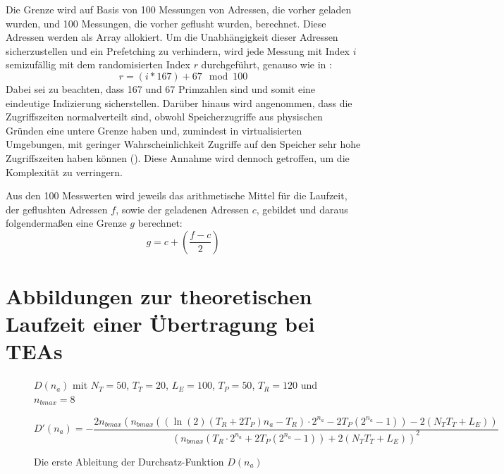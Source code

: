 Die Grenze wird auf Basis von 100 Messungen von Adressen,
die vorher geladen wurden, und 100 Messungen, die vorher
geflusht wurden, berechnet. Diese Adressen werden als Array
allokiert. Um die Unabhängigkeit dieser Adressen sicherzustellen
und ein Prefetching zu verhindern, wird jede Messung mit Index $i$
semizufällig mit dem randomisierten Index $r$ durchgeführt, genauso
wie in \cite[19]{kocher_spectre_2019}:
\[r=(i*167)+67\mod 100\]
Dabei sei zu beachten, dass 167 und 67 Primzahlen sind und somit
eine eindeutige Indizierung sicherstellen.
Darüber hinaus wird angenommen, dass die Zugriffszeiten
normalverteilt sind, obwohl Speicherzugriffe aus physischen
Gründen eine untere Grenze haben und, zumindest in virtualisierten
Umgebungen, mit geringer Wahrscheinlichkeit Zugriffe auf den
Speicher sehr hohe Zugriffszeiten haben können
(\cite[7]{yarom_flushreload_2014}). Diese Annahme wird
dennoch getroffen, um die Komplexität zu verringern.

Aus den 100 Messwerten wird jeweils das arithmetische
Mittel für die Laufzeit, der geflushten Adressen $f$,
sowie der geladenen Adressen $c$, gebildet und daraus
folgendermaßen eine Grenze $g$ berechnet:
\[g=c+\left(\frac{f-c}{2}\right)\]

\clearpage
\section{Abbildungen zur theoretischen Laufzeit einer Übertragung bei \acp{TEA}}
\begin{figure}[H]
    \centering
    \caption{$D(n_a)$ mit $N_T=50$, $T_T=20$, $L_E=100$,
    $T_P=50$, $T_R=120$ und $n_{bmax}=8$\label{figure:theoretical-runtime}}
\end{figure}

\begin{figure}[H]
    \footnotesize
    \[D'(n_a)=-\frac{2n_{bmax} \left(n_{bmax} \left(\left(\ln\left(2\right) \left(T_R + 2T_P\right) n_a - T_R\right) \cdot 2^{n_a} - 2T_P \left(2^{n_a} - 1\right)\right) - 2 \left(N_TT_T + L_E\right)\right)}{\left(n_{bmax} \left(T_R \cdot 2^{n_a} + 2T_P \left(2^{n_a} - 1\right)\right) + 2 \left(N_TT_T + L_E\right)\right)^{2}}\]
    \caption{Die erste Ableitung der Durchsatz-Funktion $D(n_a)$\label{figure:throughput-derivation}}
\end{figure}

